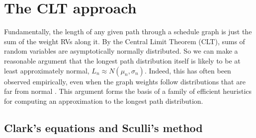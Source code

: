 \documentclass[12pt]{article}
\begin{document}

\section{The CLT approach}
\label{sect.CLT}

Fundamentally, the length of any given path through a schedule graph is just the sum of the weight RVs along it. By the Central Limit Theorem (CLT), sums of random variables are asymptotically normally distributed. So we can make a reasonable argument that the longest path distribution itself is likely to be at least approximately normal, $L_n \approx N(\mu_n, \sigma_n)$. Indeed, this has often been observed empirically, even when the graph weights follow distributions that are far from normal \cite{can10}. This argument forms the basis of a family of efficient heuristics for computing an approximation to the longest path distribution.

\subsection{Clark's equations and Sculli's method}
\label{subsect.clark_sculli}
\end{document}
